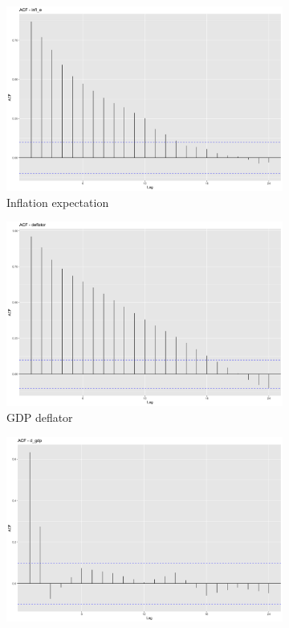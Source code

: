 \documentclass[hidelinks,12pts]{article}
\DeclareMathOperator{\1}{\mathbbm{1}}
\begin{document}
\begin{figure}[h!]
    \centering
    \begin{subfigure}[b]{0.45\textwidth}
        \centering
        \includegraphics[width=\textwidth]{IMAGES/acf_infl.png}
        \caption*{Inflation expectation}
    \end{subfigure}
    \hfill
    \begin{subfigure}[b]{0.45\textwidth}
        \centering
        \includegraphics[width=\textwidth]{IMAGES/acf_defl.png}
        \caption*{GDP deflator}
    \end{subfigure}
    \hfill 
    \centering
    \begin{subfigure}[b]{0.45\textwidth}
        \centering
        \includegraphics[width=\textwidth]{IMAGES/acf_gdp.png}

\end{subfigure}
\end{figure}
\end{document}
